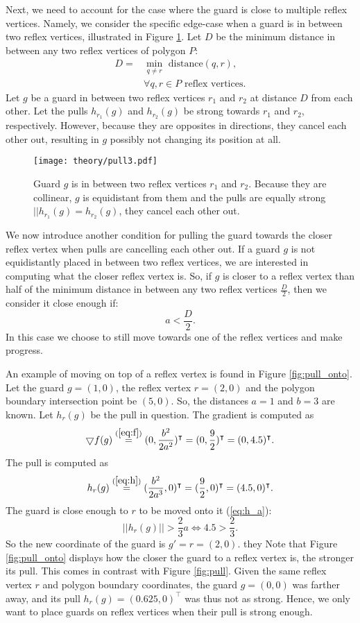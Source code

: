 Next, we need to account for the case where the guard is close to multiple reflex vertices. Namely, we consider the specific edge-case when a guard is in between two reflex vertices, illustrated in Figure \ref{fig:pull_cancel}. Let $D$ be the minimum distance in between any two reflex vertices of polygon $P$:
\begin{align*}
    D = &\min_{q \neq r} \text{ distance}(q, r), \\
    &\forall q, r \in P \text{ reflex vertices}.
\end{align*}
Let $g$ be a guard in between two reflex vertices $r_1$ and $r_2$ at distance $D$ from each other. Let the pulls $h_{r_1}(g)$ and $h_{r_2}(g)$ be strong towards $r_1$ and $r_2$, respectively. However, because they are opposites in directions, they cancel each other out, resulting in $g$ possibly not changing its position at all.

\begin{figure}[h!]
    \centering
    \texttt{[image: theory/pull3.pdf]}
    \caption{Guard $g$ is in between two reflex vertices $r_1$ and $r_2$. Because they are collinear, $g$ is equidistant from them and the pulls are equally strong $||h_{r_1}(g) = h_{r_2}(g)$, they cancel each other out.}
    \label{fig:pull_cancel}
\end{figure}

We  now introduce another condition for pulling the guard towards the closer reflex vertex when pulls are cancelling each other out. If a guard $g$ is not equidistantly placed in between two reflex vertices, we are interested in computing what the closer reflex vertex is. So, if $g$ is closer to a reflex vertex than half of the minimum distance in between any two reflex vertices $\frac D 2$, then we consider it close enough if: $$a < \frac D 2.$$
In this case we  choose to still move towards one of the reflex vertices and make progress.

An example of moving on top of a reflex vertex is found in Figure \ref{fig:pull_onto}. Let the guard $g = (1, 0)$, the reflex vertex $r = (2, 0)$ and the polygon boundary intersection point be $(5, 0)$. So, the distances $a = 1$ and $b = 3$ are known. Let $h_r(g)$ be the pull in question. The gradient is computed as
$$\bigtriangledown f(g) \overset{(\ref{eq:f})}{=} (0, \frac{b^2}{2a^2})^\intercal = (0, \frac{9}{2})^\intercal = (0, 4.5)^\intercal.$$
The pull is computed as 
$$h_r(g) \overset{(\ref{eq:h})}{=} (\frac{b^2}{2a^3}, 0)^\intercal = (\frac{9}{2}, 0)^\intercal = (4.5, 0)^\intercal.$$
The guard is close enough to $r$ to be moved onto it (\ref{eq:h_a}):
$$||h_r(g)|| > \frac 2 3 a \iff 4.5 > \frac 2 3.$$
So the new coordinate of the guard is $g' = r = (2, 0)$.
they
Note that Figure \ref{fig:pull_onto} displays how the closer the guard to a reflex vertex is, the stronger its pull. This comes in contrast with Figure \ref{fig:pull}. Given the same reflex vertex $r$ and polygon boundary coordinates, the guard $g = (0, 0)$ was farther away, and its pull $h_r(g) = (0.625, 0)^\intercal$ was thus not as strong. Hence, we only want to place guards on reflex vertices when their pull is strong enough.

